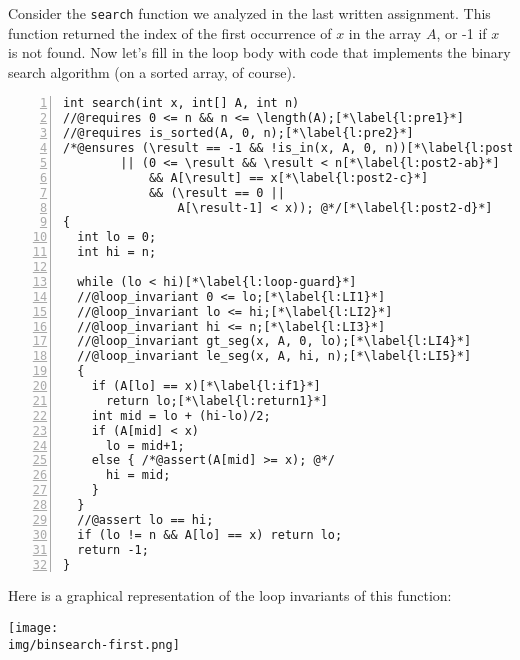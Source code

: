 \clearpage
{}


Consider the \lstinline'search' function we analyzed in the last
written assignment. This function returned the index of the first occurrence
of $x$ in the array $A$, or -1 if $x$ is not found.
Now let's fill in the loop body with code that implements the binary
search algorithm (on a sorted array, of course).

%
\enlargethispage{5ex}
\begin{lstlisting}[numbers=left]
int search(int x, int[] A, int n)
//@requires 0 <= n && n <= \length(A);[*\label{l:pre1}*]
//@requires is_sorted(A, 0, n);[*\label{l:pre2}*]
/*@ensures (\result == -1 && !is_in(x, A, 0, n))[*\label{l:post1-ab}*]
        || (0 <= \result && \result < n[*\label{l:post2-ab}*]
            && A[\result] == x[*\label{l:post2-c}*]
            && (\result == 0 ||
                A[\result-1] < x)); @*/[*\label{l:post2-d}*]
{
  int lo = 0;
  int hi = n;

  while (lo < hi)[*\label{l:loop-guard}*]
  //@loop_invariant 0 <= lo;[*\label{l:LI1}*]
  //@loop_invariant lo <= hi;[*\label{l:LI2}*]
  //@loop_invariant hi <= n;[*\label{l:LI3}*]
  //@loop_invariant gt_seg(x, A, 0, lo);[*\label{l:LI4}*]
  //@loop_invariant le_seg(x, A, hi, n);[*\label{l:LI5}*]
  {
    if (A[lo] == x)[*\label{l:if1}*]
      return lo;[*\label{l:return1}*]
    int mid = lo + (hi-lo)/2;
    if (A[mid] < x)
      lo = mid+1;
    else { /*@assert(A[mid] >= x); @*/
      hi = mid;
    }
  }
  //@assert lo == hi;
  if (lo != n && A[lo] == x) return lo;
  return -1;
}
\end{lstlisting}
Here is a graphical representation of the loop invariants of this
function:\vspace{-2.5ex}
\begin{center}
\texttt{[image: \\img/binsearch-first.png]}
\end{center}



